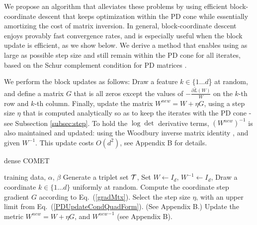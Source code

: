 \documentclass[twoside,11pt]{article}
\newcommand\mat[1]{{#1}}
\newcommand{\T}{{}^\mathsf{T}}
\newcommand{\W}{\mat{W}}
\newcommand{\newW}{{\mat{W^{new}}}}
\newcommand{\tL}{\tilde{L}(\W)}
\newcommand{\cholL}{\mat{L}}
\newcommand{\grd}{\frac{\partial \tL}{\W}}
\renewcommand{\eqref}[1]{Eq.~(\ref{#1})}
\begin{document}
We propose an algorithm that alleviates these problems by using efficient block-coordinate descent that keeps optimization within the PD cone while essentially amortizing the cost of matrix inversion.
In general, block-coordinate descent enjoys provably fast convergence rates, and is especially useful when the block update is efficient, as we show below. We derive a method that enables using as large as possible step size and still remain within the PD cone for all iterates, based on the Schur complement condition for PD matrices \citep[p. 650]{boyd2004convex}.


We perform the block updates as follows: %
Draw a feature $k \in \{1 \ldots d$\} at random, and define a matrix $\mat{G}$ that is all zeros except the values of $-\grd$ on the $k$-th row and $k$-th column. Finally, update the matrix $\newW = \W +\eta \mat{G}$, using a step size $\eta$ that is computed analytically so as to keep the iterates with the PD cone -  see Subsection \ref{subsec:step}.
To hold the $\log\det$ derivative terms, $(\newW)^{-1}$ is also maintained and updated: using the Woodbury inverse matrix identity \citep{woodbury1950inverting}, and given $\W^{-1}$. This update costs $O(d^2)$, see Appendix B for details.

\begin{algorithm}[th]
   \caption{dense COMET}
   \label{alg:comet}
\begin{algorithmic}[1]
    training data, $\alpha$, $\beta$
   \STATE Generate a triplet set $\cal{T}$, Set  $\W  \leftarrow I_d$, $\W^{-1}  \leftarrow I_d$, %
   \REPEAT 
   \STATE Draw a coordinate $k \in \{1 \ldots d\}$ uniformly at random.
   \STATE Compute the coordinate step gradient $\mat{G}$ according to \eqref{gradMtx}.
   \STATE Select the step size $\eta$, with an upper limit from \eqref{PDUpdateCondQuadForm}. (See Appendix B.)
   \STATE Update the metric $\newW=\W+\eta G$, and $\newW^{-1}$ (see Appendix B).
\end{algorithmic}
\vskip -5pt
\end{algorithm}
\end{document}
